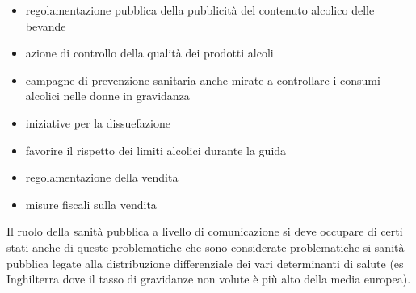 \begin{itemize}
\item
  regolamentazione pubblica della pubblicità del contenuto alcolico
  delle bevande
\item
  azione di controllo della qualità dei prodotti alcoli
\item
  campagne di prevenzione sanitaria anche mirate a controllare i consumi
  alcolici nelle donne in gravidanza
\item
  iniziative per la dissuefazione
\item
  favorire il rispetto dei limiti alcolici durante la guida
\item
  regolamentazione della vendita
\item
  misure fiscali sulla vendita
\end{itemize}

Il ruolo della sanità pubblica a livello di comunicazione si deve
occupare di certi stati anche di queste problematiche che sono
considerate problematiche si sanità pubblica legate alla distribuzione
differenziale dei vari determinanti di salute (es Inghilterra dove il
tasso di gravidanze non volute è più alto della media europea).
